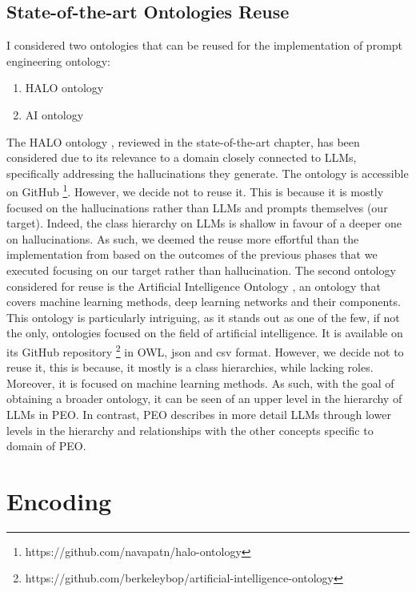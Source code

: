 \subsection{State-of-the-art Ontologies Reuse}
\label{subsection:4_2_2_reuse}

I considered two ontologies that can be reused for the implementation of prompt engineering ontology:
\begin{enumerate}
    \item HALO ontology

    \item AI ontology
\end{enumerate}


The HALO ontology \cite{nananukul2024halo}, reviewed in the state-of-the-art chapter, has been considered due to its relevance to a domain closely connected to LLMs, specifically addressing the hallucinations they generate.
The ontology is accessible on GitHub \footnote{https://github.com/navapatn/halo-ontology}.
However, we decide not to reuse it.
This is because it is mostly focused on the hallucinations rather than LLMs and prompts themselves (our target).
Indeed, the class hierarchy on LLMs is shallow in favour of a deeper one on hallucinations.
As such, we deemed the reuse more effortful than the implementation from based on the outcomes of the previous phases that we executed focusing on our target rather than hallucination.
The second ontology considered for reuse is the Artificial Intelligence Ontology \cite{aio}, an ontology that covers machine learning methods, deep learning networks and their components.
This ontology is particularly intriguing, as it stands out as one of the few, if not the only, ontologies focused on the field of artificial intelligence.
It is available on its GitHub repository \footnote{https://github.com/berkeleybop/artificial-intelligence-ontology} in OWL, json and csv format. 
However, we decide not to reuse it, this is because, it mostly is a class hierarchies, while lacking roles.
Moreover, it is focused on machine learning methods.
As such, with the goal of obtaining a broader ontology, it can be seen of an upper level in the hierarchy of LLMs in PEO.
In contrast, PEO describes in more detail LLMs through lower levels in the hierarchy and relationships with the other concepts specific to domain of PEO.


\section{Encoding}
\label{section:4_3_encoding}
